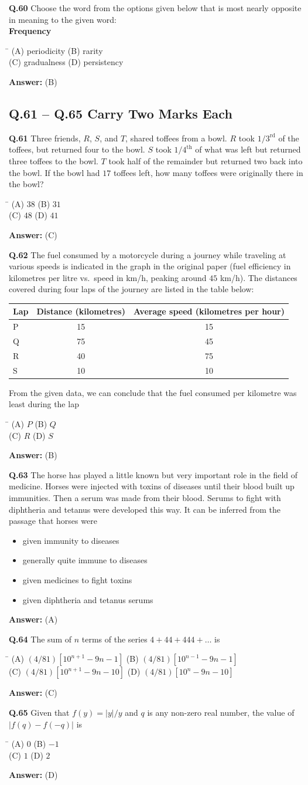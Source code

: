 \documentclass[11pt,a4paper]{article}
\newcommand{\optsfourA}[4]{%
  \begin{tabbing}
    \hspace{0.48\linewidth}\=\kill
    (A) #1 \> (B) #2 \\[2pt]
    (C) #3 \> (D) #4
  \end{tabbing}%
}
\newcommand{\optslistA}[4]{%
  \begin{itemize}
    \setlength{\itemsep}{2pt}\setlength{\parskip}{0pt}
    \item[(A)] #1
    \item[(B)] #2
    \item[(C)] #3
    \item[(D)] #4
  \end{itemize}%
}
\newcommand{\ans}[1]{\textbf{Answer:} #1\par\medskip}
\begin{document}
\textbf{Q.60} Choose the word from the options given below that is most nearly opposite in meaning to the given word:\\
\textbf{Frequency}
\optsfourA{periodicity}{rarity}{gradualness}{persistency}
\ans{(B)}

\subsection*{Q.61 -- Q.65 Carry Two Marks Each}

\textbf{Q.61} Three friends, $R$, $S$, and $T$, shared toffees from a bowl. $R$ took $1/3^{\text{rd}}$ of the toffees, but returned four to the bowl. $S$ took $1/4^{\text{th}}$ of what was left but returned three toffees to the bowl. $T$ took half of the remainder but returned two back into the bowl. If the bowl had $17$ toffees left, how many toffees were originally there in the bowl?
\optsfourA{$38$}{$31$}{$48$}{$41$}
\ans{(C)}

\textbf{Q.62} The fuel consumed by a motorcycle during a journey while traveling at various speeds is indicated in the graph in the original paper (fuel efficiency in kilometres per litre vs.\ speed in km/h, peaking around $45$ km/h). The distances covered during four laps of the journey are listed in the table below:
\begin{center}
\begin{tabular}{lcc}
  \toprule
  Lap & Distance (kilometres) & Average speed (kilometres per hour) \\
  \midrule
  P & 15 & 15 \\
  Q & 75 & 45 \\
  R & 40 & 75 \\
  S & 10 & 10 \\
  \bottomrule
\end{tabular}
\end{center}
From the given data, we can conclude that the fuel consumed per kilometre was least during the lap
\optsfourA{$P$}{$Q$}{$R$}{$S$}
\ans{(B)}

\textbf{Q.63} The horse has played a little known but very important role in the field of medicine. Horses were injected with toxins of diseases until their blood built up immunities. Then a serum was made from their blood. Serums to fight with diphtheria and tetanus were developed this way. It can be inferred from the passage that horses were
\optslistA{given immunity to diseases}{generally quite immune to diseases}{given medicines to fight toxins}{given diphtheria and tetanus serums}
\ans{(A)}

\textbf{Q.64} The sum of $n$ terms of the series $4 + 44 + 444 + \dots$ is
\optsfourA{$(4/81)[10^{n+1} - 9n - 1]$}{$(4/81)[10^{n-1} - 9n - 1]$}{$(4/81)[10^{n+1} - 9n - 10]$}{$(4/81)[10^n - 9n - 10]$}
\ans{(C)}

\textbf{Q.65} Given that $f(y) = |y|/y$ and $q$ is any non-zero real number, the value of $|f(q) - f(-q)|$ is
\optsfourA{$0$}{$-1$}{$1$}{$2$}
\ans{(D)}
\end{document}
